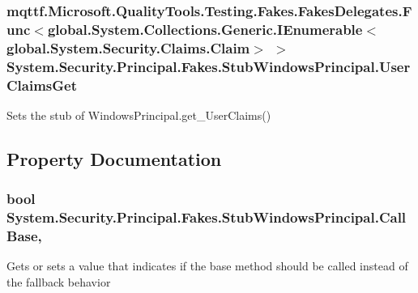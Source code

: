 \hypertarget{class_system_1_1_security_1_1_principal_1_1_fakes_1_1_stub_windows_principal_a0d76c7e83330a7ba22984ea776ca9be2}{
\subsubsection[{User\-Claims\-Get}]{\setlength{\rightskip}{0pt plus 5cm}mqttf.\-Microsoft.\-Quality\-Tools.\-Testing.\-Fakes.\-Fakes\-Delegates.\-Func$<$global.\-System.\-Collections.\-Generic.\-I\-Enumerable$<$global.\-System.\-Security.\-Claims.\-Claim$>$ $>$ System.\-Security.\-Principal.\-Fakes.\-Stub\-Windows\-Principal.\-User\-Claims\-Get}}\label{class_system_1_1_security_1_1_principal_1_1_fakes_1_1_stub_windows_principal_a0d76c7e83330a7ba22984ea776ca9be2}


Sets the stub of Windows\-Principal.\-get\-\_\-\-User\-Claims()



\subsection{Property Documentation}
\hypertarget{class_system_1_1_security_1_1_principal_1_1_fakes_1_1_stub_windows_principal_a709d89091d03e9764b2882aabbfb5960}{
\subsubsection[{Call\-Base}]{\setlength{\rightskip}{0pt plus 5cm}bool System.\-Security.\-Principal.\-Fakes.\-Stub\-Windows\-Principal.\-Call\-Base\hspace{0.3cm}{\ttfamily [get]}, {\ttfamily [set]}}}\label{class_system_1_1_security_1_1_principal_1_1_fakes_1_1_stub_windows_principal_a709d89091d03e9764b2882aabbfb5960}


Gets or sets a value that indicates if the base method should be called instead of the fallback behavior

